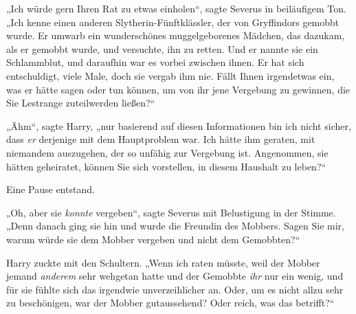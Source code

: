 „Ich würde gern Ihren Rat zu etwas einholen“, sagte Severus in beiläufigem Ton.
„Ich kenne einen anderen Slytherin-Fünftklässler, der von Gryffindors gemobbt wurde. Er umwarb ein wunderschönes muggelgeborenes Mädchen, das dazukam, als er gemobbt wurde, und versuchte, ihn zu retten. Und er nannte sie ein Schlammblut, und daraufhin war es vorbei zwischen ihnen. Er hat sich entschuldigt, viele Male, doch sie vergab ihm nie. Fällt Ihnen irgendetwas ein, was er hätte sagen oder tun können, um von ihr jene Vergebung zu gewinnen, die Sie Lestrange zuteilwerden ließen?“

„Ähm“, sagte Harry, „nur basierend auf diesen Informationen bin ich nicht sicher, dass \emph{er} derjenige mit dem Hauptproblem war. Ich hätte ihm geraten, mit niemandem auszugehen, der so unfähig zur Vergebung ist. Angenommen, sie hätten geheiratet, können Sie sich vorstellen, in diesem Haushalt zu leben?“

Eine Pause entstand.

„Oh, aber sie \emph{konnte} vergeben“, sagte Severus mit Belustigung in der Stimme.
„Denn danach ging sie hin und wurde die Freundin des Mobbers. Sagen Sie mir, warum würde sie dem Mobber vergeben und nicht dem Gemobbten?“

Harry zuckte mit den Schultern.
„Wenn ich raten müsste, weil der Mobber jemand \emph{anderem} sehr wehgetan hatte und der Gemobbte \emph{ihr} nur ein wenig, und für sie fühlte sich das irgendwie unverzeihlicher an. Oder, um es nicht allzu sehr zu beschönigen, war der Mobber gutaussehend? Oder reich, was das betrifft?“

